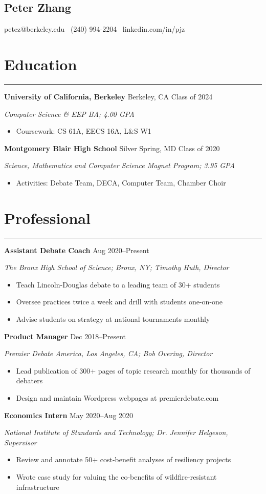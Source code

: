 \documentclass[11pt]{article}
\newcommand{\name}[1]{\begin{center}\section*{\huge \color{highlight} #1}\end{center}}
\newcommand{\topinfo}[1]{\begin{center}\vspace{-0.2cm}#1\vspace{-0.2cm}\end{center}}
\newcommand{\resumesection}[1]{\vspace{-0.3cm}\section*{\color{highlight}#1}\vspace{-0.3cm}\hrule\vspace{0.3cm}}
\begin{document}
\name{Peter Zhang}
\topinfo{petez@berkeley.edu \textbullet\ (240) 994-2204 \textbullet\ linkedin.com/in/pjz}

\resumesection{Education}

\textbf{University of California, Berkeley} Berkeley, CA \hfill Class of 2024 \par
\textit{Computer Science \& EEP BA; 4.00 GPA}
\begin{itemize}
	\item Coursework: CS 61A, EECS 16A, L\&S W1
\end{itemize}

\textbf{Montgomery Blair High School} Silver Spring, MD \hfill Class of 2020 \par
\textit{Science, Mathematics and Computer Science Magnet Program; 3.95 GPA}

\begin{itemize}
	\item Activities: Debate Team, DECA, Computer Team, Chamber Choir
\end{itemize}

\resumesection{Professional}

\textbf{Assistant Debate Coach}  \hfill Aug 2020--Present \par
\textit{The Bronx High School of Science; Bronx, NY; Timothy Huth, Director}
\begin{itemize}
	\item Teach Lincoln-Douglas debate to a leading team of 30+ students
	\item Oversee practices twice a week and drill with students one-on-one
	\item Advise students on strategy at national tournaments monthly
\end{itemize}

\textbf{Product Manager} \hfill Dec 2018--Present \par
\textit{Premier Debate America, Los Angeles, CA; Bob Overing, Director}
\begin{itemize}
	\item Lead publication of 300+ pages of topic research monthly for thousands of debaters
	\item Design and maintain Wordpress webpages at premierdebate.com
\end{itemize}

\textbf{Economics Intern} \hfill May 2020--Aug 2020\par
\textit{National Institute of Standards and Technology; Dr. Jennifer Helgeson, Supervisor}
\begin{itemize}
	\item Review and annotate 50+ cost-benefit analyses of resiliency projects
	\item Wrote case study for valuing the co-benefits of wildfire-resistant infrastructure
\end{itemize}\vspace{0.1cm}
\end{document}
